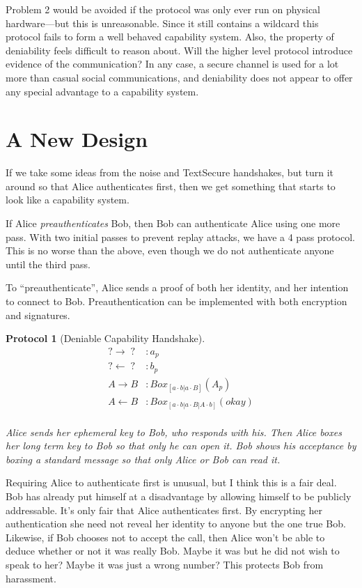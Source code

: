 \documentclass[12pt]{article}
\newtheorem{proto}{Protocol}
\begin{document}
Problem 2 would be avoided if the protocol was only ever run on
physical hardware---but this is unreasonable.
Since it still contains a wildcard this protocol
fails to form a well behaved capability system. Also, the property
of deniability feels difficult to reason about. Will the higher level
protocol introduce evidence of the communication? In any case, a secure
channel is used for a lot more than casual social communications,
and deniability does not appear to offer any special advantage
to a capability system.

\section{A New Design}

If we take some ideas from the noise and TextSecure handshakes,
but turn it around so that Alice authenticates first,
then we get something that starts to look like a capability system.

If Alice \emph{preauthenticates} Bob, then Bob can authenticate
Alice using one more pass. With two initial passes to prevent
replay attacks, we have a 4 pass protocol. This is no worse
than the above, even though we do not authenticate anyone
until the third pass.

To ``preauthenticate'', Alice sends a proof of both her identity,
and her intention to connect to Bob. Preauthentication can be
implemented with both encryption and signatures.

\begin{proto}[Deniable Capability Handshake]

  $$
  \begin{align*}
      ? \to \;?\; &: a_{p}  \\
      ? \gets \;?\; &: b_{p} \\
      A \to B &: Box_{[a \cdot b | a \cdot B]}(A_{p}) \\
      A \gets B &: Box_{[a \cdot b | a \cdot B | A \cdot b]}(okay)\\
  \end{align*}
  $$

  Alice sends her ephemeral key to Bob, who responds with his.
  Then Alice boxes her long term key to Bob so that only he can open it.
  Bob shows his acceptance by boxing a standard message
  so that only Alice or Bob can read it.

\end{proto}

Requiring Alice to authenticate first is unusual, but
I think this is a fair deal. Bob has already put himself
at a disadvantage by allowing himself to be publicly
addressable. It's only fair that Alice authenticates first.
By encrypting her authentication she need not reveal her
identity to anyone but the one true Bob. Likewise, if Bob chooses
not to accept the call, then Alice won't be able to deduce
whether or not it was really Bob. Maybe it was but he did not wish
to speak to her? Maybe it was just a wrong number? This protects
Bob from harassment.
\end{document}
